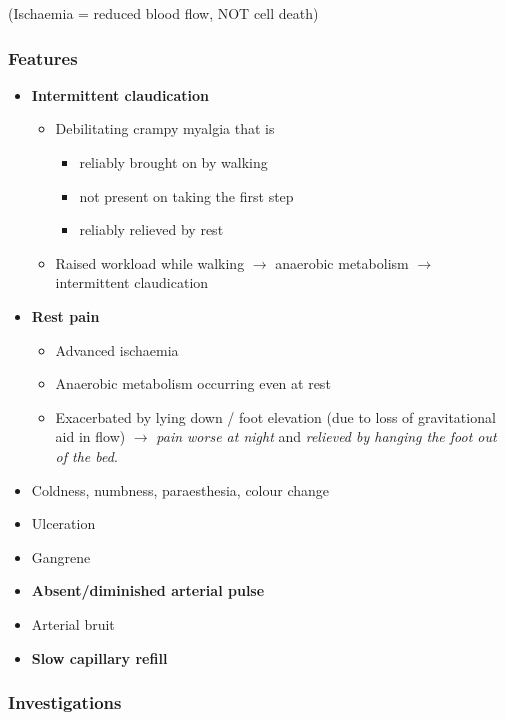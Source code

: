 \documentclass[
  14pt,
]{extarticle}
\providecommand{\tightlist}{%
  \setlength{\itemsep}{0pt}\setlength{\parskip}{0pt}}
\begin{document}
(Ischaemia = reduced blood flow, NOT cell death)

\hypertarget{features-2}{%
\subsubsection{Features}\label{features-2}}

\begin{itemize}
\tightlist
\item
  \textbf{Intermittent claudication}

  \begin{itemize}
  \tightlist
  \item
    Debilitating crampy myalgia that is

    \begin{itemize}
    \tightlist
    \item
      reliably brought on by walking
    \item
      not present on taking the first step
    \item
      reliably relieved by rest
    \end{itemize}
  \item
    Raised workload while walking \(\rightarrow\) anaerobic metabolism
    \(\rightarrow\) intermittent claudication
  \end{itemize}
\item
  \textbf{Rest pain}

  \begin{itemize}
  \tightlist
  \item
    Advanced ischaemia
  \item
    Anaerobic metabolism occurring even at rest
  \item
    Exacerbated by lying down / foot elevation (due to loss of
    gravitational aid in flow) \(\rightarrow\) \emph{pain worse at
    night} and \emph{relieved by hanging the foot out of the bed}.
  \end{itemize}
\item
  Coldness, numbness, paraesthesia, colour change
\item
  Ulceration
\item
  Gangrene
\item
  \textbf{Absent/diminished arterial pulse}
\item
  Arterial bruit
\item
  \textbf{Slow capillary refill}
\end{itemize}

\hypertarget{investigations-2}{%
\subsubsection{Investigations}\label{investigations-2}}
\end{document}
